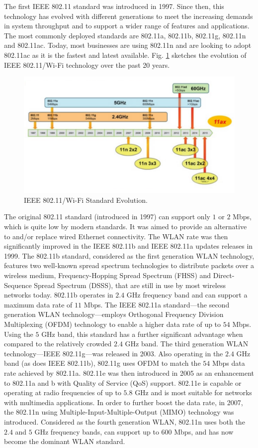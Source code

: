 The first IEEE 802.11 standard was introduced in 1997. Since then, this technology has evolved with different generations to meet the increasing demands in system throughput and to support a wider range of features and applications. The most commonly deployed standards are 802.11a, 802.11b, 802.11g, 802.11n and 802.11ac. Today, most businesses are using 802.11n and are looking to adopt 802.11ac as it is the fastest and latest available. Fig. \ref{figs:Wi-Fi-evolution} sketches the evolution of IEEE 802.11/\mbox{Wi-Fi} technology over the past 20 years.
\begin{figure}[!ht]
	\centering
	\includegraphics[width=1.0\columnwidth]{figs/Wi-Fi-evolution}
	\caption{IEEE 802.11/\mbox{Wi-Fi} Standard Evolution.}
	\label{figs:Wi-Fi-evolution}
\end{figure}
The original 802.11 standard (introduced in 1997) can support only $1$ or $2$ Mbps, which is quite low by modern standards. It was aimed to provide an alternative to and/or replace wired Ethernet connectivity. The WLAN rate was then significantly improved in the IEEE 802.11b and IEEE 802.11a updates releases in 1999. The 802.11b standard, considered as the first generation WLAN technology, features two well-known spread spectrum technologies to distribute packets over a wireless medium, Frequency-Hopping Spread Spectrum (FHSS) and Direct-Sequence Spread Spectrum (DSSS), that are still in use by most wireless networks today. 802.11b operates in $2.4$ GHz frequency band and can support a maximum data rate of $11$ Mbps. The IEEE 802.11a standard---the second generation WLAN technology---employs Orthogonal Frequency Division Multiplexing (OFDM) technology to enable a higher data rate of up to $54$ Mbps. Using the $5$ GHz band, this standard has a further significant advantage when compared to the relatively crowded $2.4$ GHz band. The third generation WLAN technology---IEEE 802.11g---was released in 2003. Also operating in the $2.4$ GHz band (as does IEEE 802.11b),  802.11g uses OFDM to match the $54$ Mbps data rate achieved by 802.11a. 802.11e was then introduced in 2005 as an enhancement to 802.11a and b with Quality of Service (QoS) support. 802.11e is capable or operating at radio frequencies of up to $5.8$ GHz and is most suitable for networks with multimedia applications. In order to further boost the data rate, in 2007, the 802.11n using Multiple-Input-Multiple-Output (MIMO) technology was introduced. Considered as the fourth generation WLAN, 802.11n uses both the $2.4$ and $5$ GHz frequency bands, can support up to $600$ Mbps, and has now become the dominant WLAN standard.

